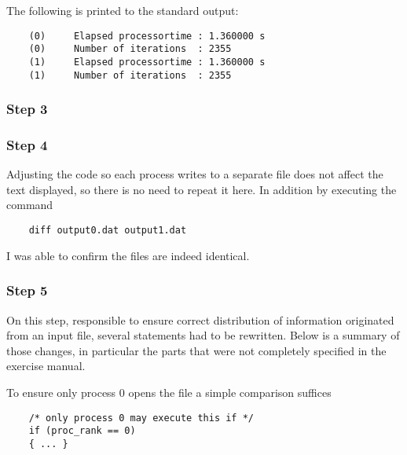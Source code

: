 The following is printed to the standard output:
\begin{lstlisting}
    (0)     Elapsed processortime : 1.360000 s
    (0)     Number of iterations  : 2355
    (1)     Elapsed processortime : 1.360000 s
    (1)     Number of iterations  : 2355
\end{lstlisting}

\subsubsection{Step 3}


\subsubsection{Step 4}

Adjusting the code so each process writes to a separate file does not affect the text displayed, so there is no need to repeat it here. In addition by executing the command

\begin{lstlisting}
    diff output0.dat output1.dat
\end{lstlisting}

I was able to confirm the files are indeed identical.

\subsubsection{Step 5}

On this step, responsible to ensure correct distribution of information originated from an input file, several statements had to be rewritten. Below is a summary of those changes, in particular the parts that were not completely specified in the exercise manual.

To ensure only process 0 opens the file a simple comparison suffices
\begin{lstlisting}
    /* only process 0 may execute this if */
    if (proc_rank == 0)
    { ... }
\end{lstlisting}

